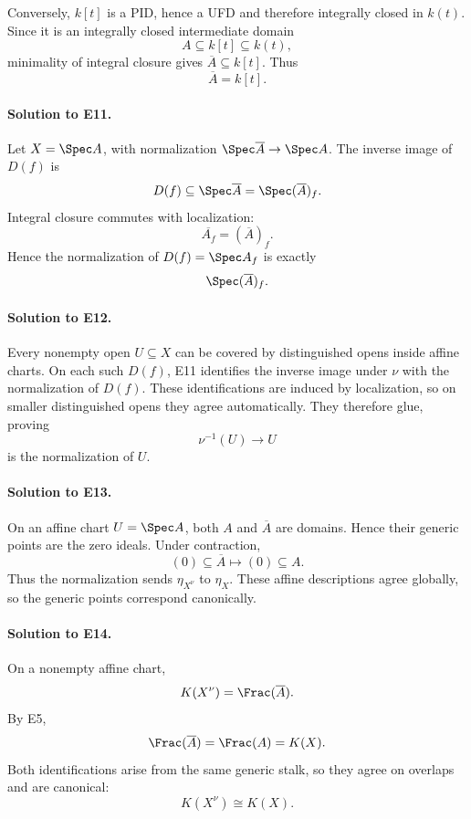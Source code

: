 Conversely, \(k[t]\) is a PID, hence a UFD and therefore integrally closed in \(k(t)\).  Since it is
an integrally closed intermediate domain
\[
A\subseteq k[t]\subseteq k(t),
\]
minimality of integral closure gives \(\overline A\subseteq k[t]\).  Thus
\[
\boxed{\overline A=k[t].}
\]

\paragraph{Solution to E11.}
Let \(X=\Spec A\), with normalization \(\Spec\overline A\to\Spec A\).  The inverse image of
\(D(f)\) is
\[
D(f)\subseteq\Spec\overline A
=
\Spec(\overline A)_f.
\]
Integral closure commutes with localization:
\[
\overline{A_f}=(\overline A)_f.
\]
Hence the normalization of \(D(f)=\Spec A_f\) is exactly
\[
\Spec(\overline A)_f.
\]

\paragraph{Solution to E12.}
Every nonempty open \(U\subseteq X\) can be covered by distinguished opens inside affine charts.
On each such \(D(f)\), E11 identifies the inverse image under \(\nu\) with the normalization of
\(D(f)\).  These identifications are induced by localization, so on smaller distinguished opens
they agree automatically.  They therefore glue, proving
\[
\nu^{-1}(U)\longrightarrow U
\]
is the normalization of \(U\).

\paragraph{Solution to E13.}
On an affine chart \(U=\Spec A\), both \(A\) and \(\overline A\) are domains.  Hence their generic
points are the zero ideals.  Under contraction,
\[
(0)\subseteq\overline A
\longmapsto
(0)\subseteq A.
\]
Thus the normalization sends \(\eta_{X^\nu}\) to \(\eta_X\).  These affine descriptions agree
globally, so the generic points correspond canonically.

\paragraph{Solution to E14.}
On a nonempty affine chart,
\[
K(X^\nu)=\Frac(\overline A).
\]
By E5,
\[
\Frac(\overline A)=\Frac(A)=K(X).
\]
Both identifications arise from the same generic stalk, so they agree on overlaps and are canonical:
\[
\boxed{K(X^\nu)\cong K(X).}
\]

